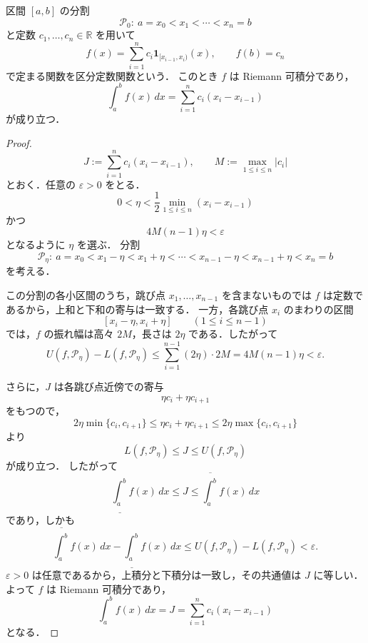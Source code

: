 \begin{example}[区分定数関数]
区間 $[a,b]$ の分割
\[
\mathcal P_0:\ a=x_0<x_1<\cdots<x_n=b
\]
と定数 $c_1,\dots,c_n\in\mathbb R$ を用いて
\[
f(x)=\sum_{i=1}^n c_i \mathbf 1_{[x_{i-1},x_i)}(x),
\qquad
f(b)=c_n
\]
で定まる関数を区分定数関数という．
このとき $f$ は Riemann 可積分であり，
\[
\int_a^b f(x)\,dx
=
\sum_{i=1}^n c_i(x_i-x_{i-1})
\]
が成り立つ．
\end{example}

\begin{proof}
\[
J:=\sum_{i=1}^n c_i(x_i-x_{i-1}),
\qquad
M:=\max_{1\le i\le n}|c_i|
\]
とおく．任意の $\varepsilon>0$ をとる．
\[
0<\eta<\frac12\min_{1\le i\le n}(x_i-x_{i-1})
\]
かつ
\[
4M(n-1)\eta<\varepsilon
\]
となるように $\eta$ を選ぶ．
分割
\[
\mathcal P_\eta:\ 
a=x_0<x_1-\eta<x_1+\eta<\cdots<x_{n-1}-\eta<x_{n-1}+\eta<x_n=b
\]
を考える．

この分割の各小区間のうち，跳び点 $x_1,\dots,x_{n-1}$ を含まないものでは
$f$ は定数であるから，上和と下和の寄与は一致する．
一方，各跳び点 $x_i$ のまわりの区間
\[
[x_i-\eta,x_i+\eta]
\qquad
(1\le i\le n-1)
\]
では，$f$ の振れ幅は高々 $2M$，長さは $2\eta$ である．したがって
\[
U(f,\mathcal P_\eta)-L(f,\mathcal P_\eta)
\le
\sum_{i=1}^{n-1}(2\eta)\cdot 2M
=
4M(n-1)\eta
<
\varepsilon.
\]

さらに，$J$ は各跳び点近傍での寄与
\[
\eta c_i+\eta c_{i+1}
\]
をもつので，
\[
2\eta\min\{c_i,c_{i+1}\}
\le
\eta c_i+\eta c_{i+1}
\le
2\eta\max\{c_i,c_{i+1}\}
\]
より
\[
L(f,\mathcal P_\eta)\le J\le U(f,\mathcal P_\eta)
\]
が成り立つ．
したがって
\[
\underline{\int_a^b} f(x)\,dx
\le
J
\le
\overline{\int_a^b} f(x)\,dx
\]
であり，しかも
\[
\overline{\int_a^b} f(x)\,dx
-
\underline{\int_a^b} f(x)\,dx
\le
U(f,\mathcal P_\eta)-L(f,\mathcal P_\eta)
<
\varepsilon.
\]
$\varepsilon>0$ は任意であるから，上積分と下積分は一致し，その共通値は $J$ に等しい．
よって $f$ は Riemann 可積分であり，
\[
\int_a^b f(x)\,dx
=
J
=
\sum_{i=1}^n c_i(x_i-x_{i-1})
\]
となる．
\end{proof}



